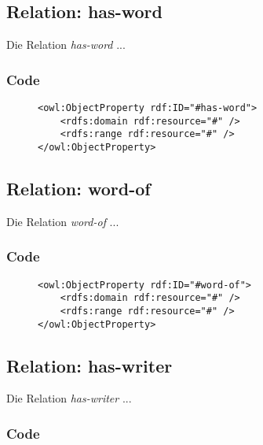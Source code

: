 \documentclass[
    11pt,
    latin1,
    a4paper,
    oneside
]{scrreprt}
\begin{document}
\subsection{Relation: has-word} \label{sec:rel_hasword}

Die Relation \emph{has-word} ...

\subsubsection{Code} \label{sec:rel_hasword_code}

\begin{figure}[h]
 \lstset{language=XML}
 \begin{lstlisting}[label=owl:word]
<owl:ObjectProperty rdf:ID="#has-word">
	<rdfs:domain rdf:resource="#" />
	<rdfs:range rdf:resource="#" />
</owl:ObjectProperty>
 \end{lstlisting}
\end{figure}


\subsection{Relation: word-of} \label{sec:rel_wordof}

Die Relation \emph{word-of} ...

\subsubsection{Code} \label{sec:rel_wordof_code}

\begin{figure}[h]
 \lstset{language=XML}
 \begin{lstlisting}[label=owl:word]
<owl:ObjectProperty rdf:ID="#word-of">
	<rdfs:domain rdf:resource="#" />
	<rdfs:range rdf:resource="#" />
</owl:ObjectProperty>
 \end{lstlisting}
\end{figure}


\subsection{Relation: has-writer} \label{sec:rel_haswriter}

Die Relation \emph{has-writer} ...

\subsubsection{Code} \label{sec:rel_haswriter_code}
\end{document}
